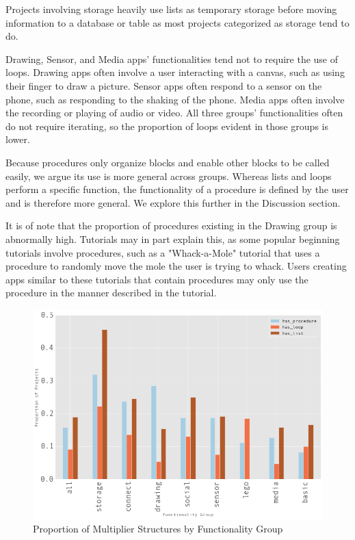 \documentclass[conference]{IEEEtran}
\begin{document}
Projects involving storage heavily use lists as temporary storage before moving information to a database or table as most projects categorized as storage tend to do. 

Drawing, Sensor, and Media apps' functionalities tend not to require the use of loops. Drawing apps often involve a user interacting with a canvas, such as using their finger to draw a picture. Sensor apps often respond to a sensor on the phone, such as responding to the shaking of the phone. Media apps often involve the recording or playing of audio or video. All three groups' functionalities often do not require iterating, so the proportion of loops evident in those groups is lower.

Because procedures only organize blocks and enable other blocks to be called easily, we argue its use is more general across groups. Whereas lists and loops perform a specific function, the functionality of a procedure is defined by the user and is therefore more general. We explore this further in the Discussion section. 

It is of note that the proportion of procedures existing in the Drawing group is abnormally high. Tutorials may in part explain this, as some popular beginning tutorials involve procedures, such as a "Whack-a-Mole" tutorial that uses a procedure to randomly move the mole the user is trying to whack. Users creating apps similar to these tutorials that contain procedures may only use the procedure in the manner described in the tutorial.

\begin{figure}[h!]
	\centering
	\includegraphics[width=1\linewidth]{multipliers.png}
	\caption{Proportion of Multiplier Structures by Functionality Group}
	\label{multipliers}
\end{figure}
\end{document}
